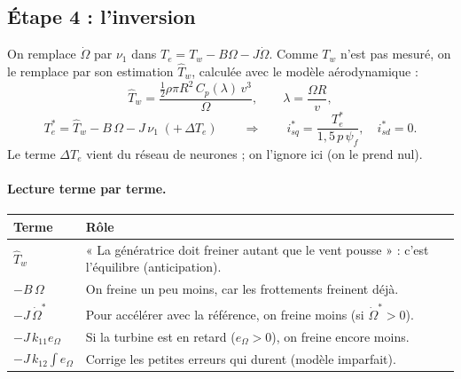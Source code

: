 \documentclass[11pt,a4paper]{article}
\begin{document}
\subsection{Étape 4 : l'inversion}
On remplace $\dot\Omega$ par $\nu_1$ dans $T_e = T_w - B\Omega - J\dot\Omega$. Comme $T_w$ n'est pas mesuré,
on le remplace par son estimation $\hat T_w$, calculée avec le modèle aérodynamique :
\begin{equation}
\hat T_w = \frac{\tfrac12\rho\pi R^2\,C_p(\lambda)\,v^3}{\Omega}, \qquad \lambda = \frac{\Omega R}{v},
\end{equation}
\begin{equation}
\boxed{T_e^* = \hat T_w - B\,\Omega - J\,\nu_1 \;(+\,\Delta T_e)}
\qquad\Longrightarrow\qquad
i_{sq}^* = \frac{T_e^*}{1{,}5\,p\,\psi_f}, \quad i_{sd}^* = 0 .
\end{equation}
Le terme $\Delta T_e$ vient du réseau de neurones ; on l'ignore ici (on le prend nul).

\paragraph{Lecture terme par terme.}
\begin{center}
\begin{tabular}{lp{11cm}}
\toprule
Terme & Rôle\\
\midrule
$\hat T_w$ & « La génératrice doit freiner autant que le vent pousse » : c'est l'équilibre (anticipation).\\
$-B\,\Omega$ & On freine un peu moins, car les frottements freinent déjà.\\
$-J\,\dot\Omega^*$ & Pour accélérer avec la référence, on freine moins (si $\dot\Omega^*>0$).\\
$-J\,k_{11}e_\Omega$ & Si la turbine est en retard ($e_\Omega>0$), on freine encore moins.\\
$-J\,k_{12}\int e_\Omega$ & Corrige les petites erreurs qui durent (modèle imparfait).\\
\bottomrule
\end{tabular}
\end{center}
\end{document}
